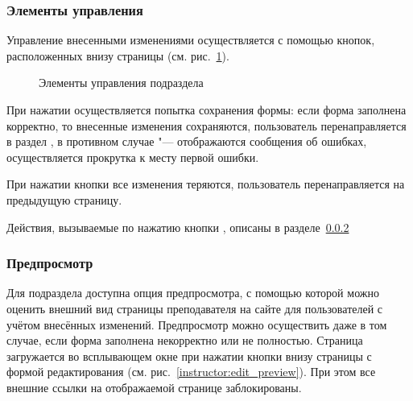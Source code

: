 	\subsubsection{Элементы управления}

Управление внесенными изменениями осуществляется с помощью кнопок, расположенных внизу страницы (см. рис.~\ref{instructor:edit_buttons}).
		\begin{figure}[H]
		\caption{Элементы управления подраздела }
		\label{instructor:edit_buttons}
		\end{figure}	
		
При нажатии  осуществляется попытка сохранения формы: если форма заполнена корректно, то внесенные изменения сохраняются, пользователь перенаправляется в раздел , в противном случае "--- отображаются сообщения об ошибках, осуществляется прокрутка к месту первой ошибки. 


При нажатии кнопки  все изменения теряются, пользователь перенаправляется на предыдущую страницу.

Действия, вызываемые по нажатию кнопки , описаны в разделе~\ref{instructor:edit_preview_ch}

\subsubsection{Предпросмотр}\label{instructor:edit_preview_ch}
Для подраздела  доступна опция предпросмотра, с помощью которой можно оценить внешний вид страницы преподавателя на сайте для пользователей с учётом внесённых изменений. Предпросмотр можно осуществить даже в том случае, если форма заполнена некорректно или не полностью. Страница загружается во всплывающем окне при нажатии кнопки  внизу страницы с формой редактирования (см. рис.~\ref{instructor:edit_preview}). При этом все внешние ссылки на отображаемой странице заблокированы.

